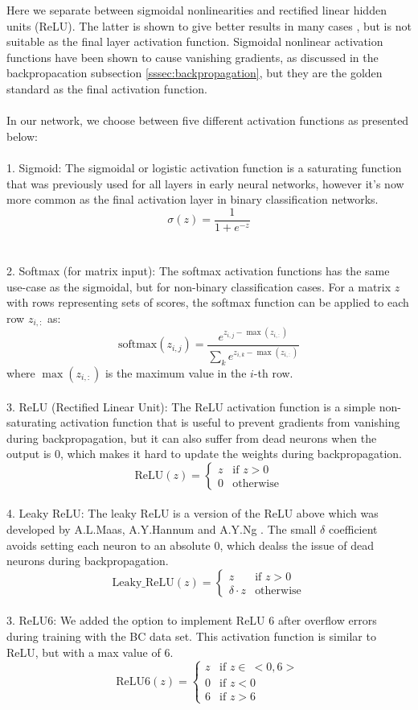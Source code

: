Here we separate between sigmoidal nonlinearities and rectified linear hidden units (ReLU). The latter is shown to give better results in many cases 
\cite{relu_best_ever}, but is not suitable as the final layer activation function. Sigmoidal nonlinear activation functions have been shown to 
cause vanishing gradients, as discussed in the backpropacation subsection \ref{sssec:backpropagation}, but they are the golden standard as the final activation function. 
\\
\\
In our network, we choose between five different activation functions as presented below: 
\\
\\
1. Sigmoid:
The sigmoidal or logistic activation function is a saturating function that was previously used for all layers in early neural networks, 
however it's now more common as the final activation layer in binary classification networks.
\[
\sigma(z) = \frac{1}{1 + e^{-z}}
\]
\\
\\
2. Softmax (for matrix input):
The softmax activation functions has the same use-case as the sigmoidal, but for non-binary classification cases. For a matrix \( z \) with rows representing sets of scores, the softmax function can be applied to each row \( z_{i,:} \) as:
\[
\text{softmax}(z_{i,j}) = \frac{e^{z_{i,j} - \max(z_{i,:})}}{\sum_{k} e^{z_{i,k} - \max(z_{i,:})}}
\]
where \( \max(z_{i,:}) \) is the maximum value in the \( i \)-th row.
\\
\\
3. ReLU (Rectified Linear Unit):
The ReLU activation function is a simple non-saturating activation function that is useful to prevent gradients from vanishing during backpropagation, 
but it can also suffer from dead neurons when the output is 0, which makes it hard to update the weights during backpropagation.  
\[
\text{ReLU}(z) = 
\begin{cases} 
   z & \text{if } z > 0 \\
   0 & \text{otherwise}
\end{cases}
\]
\\
4. Leaky ReLU:
The leaky ReLU is a version of the ReLU above which was developed by A.L.Maas, A.Y.Hannum and A.Y.Ng \cite{relu_best_ever}. The small $\delta$ coefficient avoids
setting each neuron to an absolute 0, which dealss the issue of dead neurons during backpropagation.
\[
\text{Leaky\_ReLU}(z) = 
\begin{cases} 
   z & \text{if } z > 0 \\
   \delta \cdot z & \text{otherwise}
\end{cases}
\]
\\
3. ReLU6:
We added the option to implement ReLU 6 after overflow errors during training with the BC data set. This activation
function is similar to ReLU, but with a max value of 6. 
\[
\text{ReLU6}(z) = 
\begin{cases} 
   z & \text{if } z \in \ <0, 6> \\
   0 & \text{if } z < 0 \\
   6 & \text{if } z > 6
\end{cases}
\]
\\


